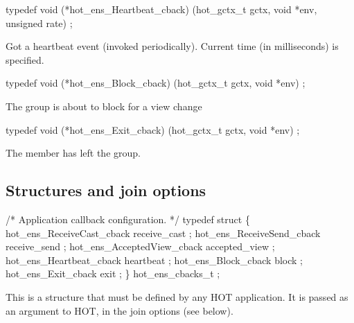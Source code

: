 \begin{codebox}
typedef void (*hot_ens_Heartbeat_cback)
    (hot_gctx_t gctx, void *env, unsigned rate) ;
\end{codebox}
Got a heartbeat event (invoked periodically).  Current time (in
milliseconds) is specified.

\begin{codebox}
typedef void (*hot_ens_Block_cback)
  (hot_gctx_t gctx, void *env) ;
\end{codebox}
The group is about to block for a view change 

\begin{codebox}
typedef void (*hot_ens_Exit_cback)
  (hot_gctx_t gctx, void *env) ;
\end{codebox}
The member has left the group.

\subsection{Structures and join options}
\begin{codebox}
/* Application callback configuration.
 */
typedef struct \{
  hot_ens_ReceiveCast_cback receive_cast ;
  hot_ens_ReceiveSend_cback receive_send ;
  hot_ens_AcceptedView_cback accepted_view ;
  hot_ens_Heartbeat_cback heartbeat ;
  hot_ens_Block_cback block ;
  hot_ens_Exit_cback exit ;
\} hot_ens_cbacks_t ;
\end{codebox}
This is a structure that must be defined by any HOT application. It
is passed as an argument to HOT, in the join options (see below).

